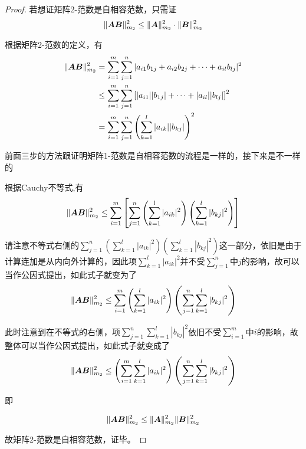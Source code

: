 \documentclass[12pt, a4paper, oneside, UTF8]{ctexbook}
\begin{document}
\begin{proof}
    若想证矩阵2-范数是自相容范数，只需证\[\Vert\boldsymbol{AB}\Vert_{m_2}^2\leq\Vert\boldsymbol{A}\Vert_{m_2}^2\cdot\Vert\boldsymbol{B}\Vert_{m_2}^2\]

    根据矩阵2-范数的定义，有
    \[\begin{aligned}
        \Vert\boldsymbol{AB}\Vert^2_{m_2}&=\sum_{i=1}^{m}\sum_{j=1}^{n}|a_{i1}b_{1j}+a_{i2}b_{2j}+\cdots+a_{il}b_{lj}|^2\\
        &\leq\sum_{i=1}^{m}\sum_{j=1}^{n}\left[|a_{i1}||b_{1j}|+\cdots+|a_{il}||b_{lj}|\right]^2\\
        &=\sum_{i=1}^{m}\sum_{j=1}^{n}\left(\sum_{k=1}^{l}|a_{ik}||b_{kj}|\right)^2
    \end{aligned}
    \]
    
    前面三步的方法跟证明矩阵1-范数是自相容范数的流程是一样的，接下来是不一样的
    
    根据Cauchy不等式,有
    \[
        \begin{aligned}
            \Vert\boldsymbol{AB}\Vert_{m_2}^2\leq\sum_{i=1}^{m}\left[\sum_{j=1}^{n}\left(\sum_{k=1}^{l}|a_{ik}|^2\right)\left(\sum_{k=1}^{l}|b_{kj}|^2\right)\right]
        \end{aligned}
    \]

    请注意不等式右侧的$\sum_{j=1}^{n}\left(\sum_{k=1}^{l}|a_{ik}|^2\right)\left(\sum_{k=1}^{l}|b_{kj}|^2\right)$这一部分，依旧是由于计算连加是从内向外计算的，因此项$\sum_{k=1}^{l}|a_{ik}|^2$并不受$\sum_{j=1}^{n}$中$j$的影响，故可以当作公因式提出，如此式子就变为了
    \[\Vert\boldsymbol{AB}\Vert_{m_2}^2\leq\sum_{i=1}^{m}\left(\sum_{k=1}^{l}|a_{ik}|^2\right)\left(\sum_{j=1}^{n}\sum_{k=1}^{l}|b_{kj}|^2\right)\]
    
    此时注意到在不等式的右侧，项$\sum_{j=1}^{n}\sum_{k=1}^{l}|b_{kj}|^2$依旧不受$\sum_{i=1}^{m}$中$i$的影响，故整体可以当作公因式提出，如此式子就变成了
    \[\Vert\boldsymbol{AB}\Vert_{m_2}^2\leq\left(\sum_{i=1}^{m}\sum_{k=1}^{l}|a_{ik}|^2\right)\left(\sum_{j=1}^{n}\sum_{k=1}^{l}|b_{kj}|^2\right)\]

    即

    \[\Vert\boldsymbol{AB}\Vert_{m_2}^2\leq\Vert\boldsymbol{A}\Vert_{m_2}^2\Vert\boldsymbol{B}\Vert_{m_2}^2\]

    故矩阵2-范数是自相容范数，证毕。
\end{proof}
\end{document}
